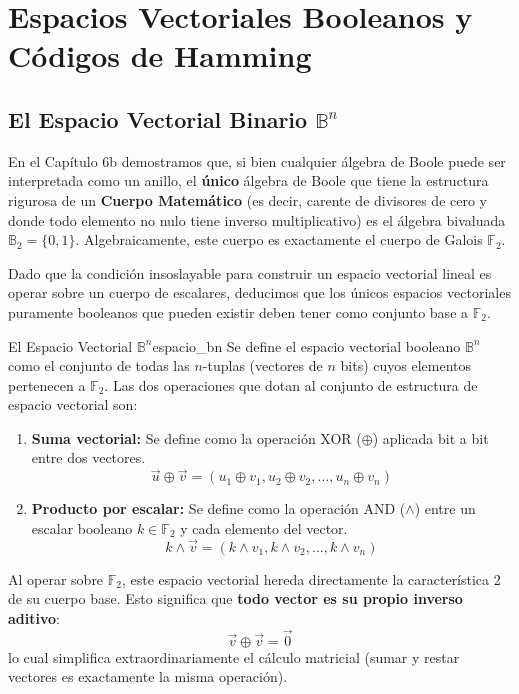 \chapter{Espacios Vectoriales Booleanos y Códigos de Hamming}

\section{El Espacio Vectorial Binario $\mathbb{B}^n$}

En el Capítulo 6b demostramos que, si bien cualquier álgebra de Boole puede ser interpretada como un anillo, el \textbf{único} álgebra de Boole que tiene la estructura rigurosa de un \textbf{Cuerpo Matemático} (es decir, carente de divisores de cero y donde todo elemento no nulo tiene inverso multiplicativo) es el álgebra bivaluada $\mathbb{B}_2 = \{0, 1\}$. Algebraicamente, este cuerpo es exactamente el cuerpo de Galois $\mathbb{F}_2$.

Dado que la condición insoslayable para construir un espacio vectorial lineal es operar sobre un cuerpo de escalares, deducimos que los únicos espacios vectoriales puramente booleanos que pueden existir deben tener como conjunto base a $\mathbb{F}_2$.

\begin{definicion}{El Espacio Vectorial $\mathbb{B}^n$}{espacio_bn}
Se define el espacio vectorial booleano $\mathbb{B}^n$ como el conjunto de todas las $n$-tuplas (vectores de $n$ bits) cuyos elementos pertenecen a $\mathbb{F}_2$. 
Las dos operaciones que dotan al conjunto de estructura de espacio vectorial son:
\begin{enumerate}
    \item \textbf{Suma vectorial:} Se define como la operación XOR ($\oplus$) aplicada bit a bit entre dos vectores.
    \[ \vec{u} \oplus \vec{v} = (u_1 \oplus v_1, u_2 \oplus v_2, \ldots, u_n \oplus v_n) \]
    \item \textbf{Producto por escalar:} Se define como la operación AND ($\wedge$) entre un escalar booleano $k \in \mathbb{F}_2$ y cada elemento del vector.
    \[ k \wedge \vec{v} = (k \wedge v_1, k \wedge v_2, \ldots, k \wedge v_n) \]
\end{enumerate}
\end{definicion}

Al operar sobre $\mathbb{F}_2$, este espacio vectorial hereda directamente la característica 2 de su cuerpo base. Esto significa que \textbf{todo vector es su propio inverso aditivo}:
\[ \vec{v} \oplus \vec{v} = \vec{0} \]
lo cual simplifica extraordinariamente el cálculo matricial (sumar y restar vectores es exactamente la misma operación).

